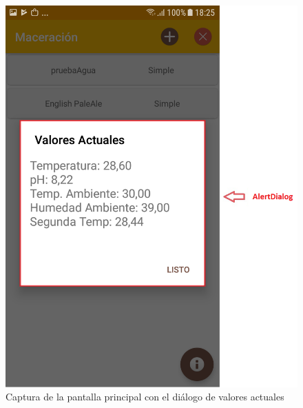                  \begin{figure}[h]
                    \centering
                    \includegraphics[scale=0.2]{software/ScreenCapture/ShowCurrentValues.jpg}
                    \caption{Captura de la pantalla principal con el diálogo de valores actuales}
                    \label{fig:CapturaShowCurrentValues}
                \end{figure}
                
                
